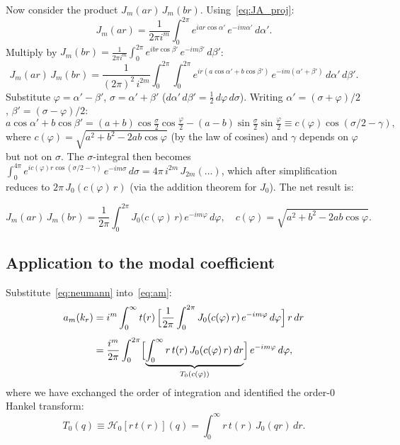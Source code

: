 \documentclass[11pt,a4paper]{article}
\newcommand{\HT}{\mathcal{H}}
\begin{document}
Now consider the product $J_m(ar)\,J_m(br)$.  Using~\eqref{eq:JA_proj}:
\begin{equation}
  J_m(ar) = \frac{1}{2\pi i^m}\int_0^{2\pi} e^{iar\cos\alpha'}\,e^{-im\alpha'}\,d\alpha'.
\end{equation}
Multiply by $J_m(br) = \frac{1}{2\pi i^m}\int_0^{2\pi} e^{ibr\cos\beta'}\,e^{-im\beta'}\,d\beta'$:
\begin{equation}
  J_m(ar)\,J_m(br) = \frac{1}{(2\pi)^2\,i^{2m}}
  \int_0^{2\pi}\!\!\int_0^{2\pi}
  e^{ir(a\cos\alpha'+b\cos\beta')}\,e^{-im(\alpha'+\beta')}\,d\alpha'\,d\beta'.
\end{equation}
Substitute $\varphi = \alpha'-\beta'$, $\sigma = \alpha'+\beta'$
($d\alpha'\,d\beta' = \tfrac{1}{2}\,d\varphi\,d\sigma$).
Writing $\alpha' = (\sigma+\varphi)/2$, $\beta' = (\sigma-\varphi)/2$:
\begin{equation}
  a\cos\alpha' + b\cos\beta'
  = (a+b)\cos\tfrac{\sigma}{2}\cos\tfrac{\varphi}{2}
  - (a-b)\sin\tfrac{\sigma}{2}\sin\tfrac{\varphi}{2}
  \equiv c(\varphi)\cos(\sigma/2 - \gamma),
\end{equation}
where $c(\varphi) = \sqrt{a^2 + b^2 - 2ab\cos\varphi}$ (by the law of cosines)
and $\gamma$ depends on $\varphi$ but not on $\sigma$.
The $\sigma$-integral then becomes
$\int_0^{4\pi} e^{ic(\varphi)r\cos(\sigma/2-\gamma)}\,e^{-im\sigma}\,d\sigma
= 4\pi\,i^{2m}\,J_{2m}(\ldots)$, which after simplification reduces to
$2\pi\,J_0(c(\varphi)\,r)$ (via the addition theorem for $J_0$).
The net result is:

\begin{tcolorbox}[title=Neumann addition formula]
\begin{equation}\label{eq:neumann}
  J_m(ar)\,J_m(br)
  = \frac{1}{2\pi}\int_0^{2\pi}
    J_0\!\bigl(c(\varphi)\,r\bigr)\,e^{-im\varphi}\,d\varphi,
  \quad c(\varphi) = \sqrt{a^2+b^2-2ab\cos\varphi}.
\end{equation}
\end{tcolorbox}

\subsection{Application to the modal coefficient}

Substitute~\eqref{eq:neumann} into~\eqref{eq:am}:
\begin{align}
  a_m(k_r) &= i^m\int_0^\infty t(r)\,
  \Bigl[\frac{1}{2\pi}\int_0^{2\pi} J_0(c(\varphi)\,r)\,e^{-im\varphi}\,d\varphi\Bigr]\,r\,dr
  \nonumber\\[4pt]
  &= \frac{i^m}{2\pi}\int_0^{2\pi}\Bigl[
    \underbrace{\int_0^\infty r\,t(r)\,J_0(c(\varphi)\,r)\,dr}_{T_0(c(\varphi))}
  \Bigr]\,e^{-im\varphi}\,d\varphi,
\end{align}
where we have exchanged the order of integration and identified the order-0
Hankel transform:
\begin{equation}
  T_0(q) \equiv \HT_0[r\,t(r)](q) = \int_0^\infty r\,t(r)\,J_0(qr)\,dr.
\end{equation}
\end{document}
